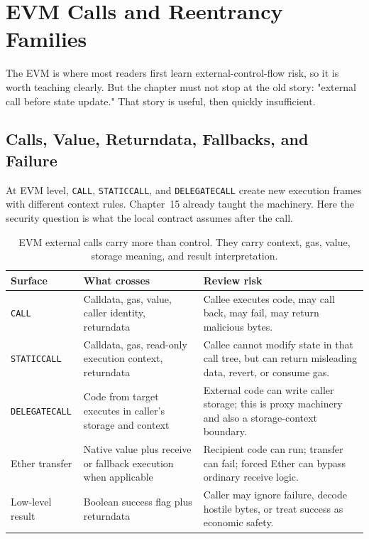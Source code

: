 \section{EVM Calls and Reentrancy Families}

The EVM is where most readers first learn external-control-flow risk, so it is worth teaching clearly. But the chapter must not stop at the old story: "external call before state update." That story is useful, then quickly insufficient.

\subsection{Calls, Value, Returndata, Fallbacks, and Failure}

At EVM level, \texttt{CALL}, \texttt{STATICCALL}, and \texttt{DELEGATECALL} create new execution frames with different context rules. Chapter~15 already taught the machinery. Here the security question is what the local contract assumes after the call.

\begin{table}[htbp]
\centering
\small
\renewcommand{\arraystretch}{1.16}
\begin{tabularx}{\textwidth}{@{}>{\RaggedRight\arraybackslash}p{}>{\RaggedRight\arraybackslash}p{}X@{}}
\toprule
Surface & What crosses & Review risk \\
\midrule
\texttt{CALL} & Calldata, gas, value, caller identity, returndata & Callee executes code, may call back, may fail, may return malicious bytes. \\
\texttt{STATICCALL} & Calldata, gas, read-only execution context, returndata & Callee cannot modify state in that call tree, but can return misleading data, revert, or consume gas. \\
\texttt{DELEGATECALL} & Code from target executes in caller's storage and context & External code can write caller storage; this is proxy machinery and also a storage-context boundary. \\
Ether transfer & Native value plus receive or fallback execution when applicable & Recipient code can run; transfer can fail; forced Ether can bypass ordinary receive logic. \\
Low-level result & Boolean success flag plus returndata & Caller may ignore failure, decode hostile bytes, or treat success as economic safety. \\
\bottomrule
\end{tabularx}
\caption{EVM external calls carry more than control. They carry context, gas, value, storage meaning, and result interpretation.}
\end{table}

